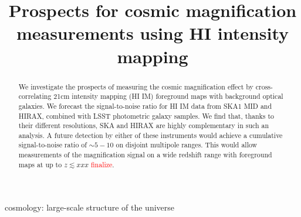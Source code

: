 \documentclass[useAMS,usenatbib]{mnras}
\title[Magnification measurements with HI intensity mapping]
{Prospects for cosmic magnification measurements using HI intensity mapping}
\newcommand{\ama}[1]{\textcolor{red}{{#1}}}
\begin{document}
\maketitle

\begin{abstract}
We investigate the prospects of measuring the cosmic magnification effect by cross-correlating 21cm intensity mapping (HI IM) foreground maps with background optical galaxies. We forecast the signal-to-noise ratio for HI IM data from SKA1 MID and HIRAX, combined with LSST photometric galaxy samples. We find that, thanks to their different resolutions, SKA and HIRAX are highly complementary in such an analysis. A future detection by either of these instruments would achieve a cumulative signal-to-noise ratio of $\sim 5-10$ on disjoint multipole ranges. This would allow measurements of the magnification signal on a wide redshift range with foreground maps at up to $z \lesssim xxx$ \ama{finalize}.
\end{abstract}

\begin{keywords}
cosmology: large-scale structure of the universe
\end{keywords}

\end{document}
